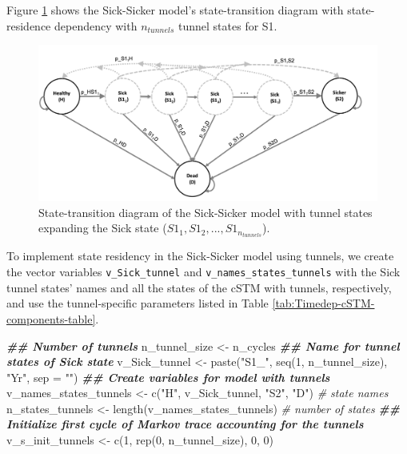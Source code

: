 \documentclass[
]{article}
\newenvironment{Shaded}{\begin{snugshade}}{\end{snugshade}}
\newcommand{\AttributeTok}[1]{\textcolor[rgb]{0.77,0.63,0.00}{#1}}
\newcommand{\CommentTok}[1]{\textcolor[rgb]{0.56,0.35,0.01}{\textit{#1}}}
\newcommand{\DecValTok}[1]{\textcolor[rgb]{0.00,0.00,0.81}{#1}}
\newcommand{\DocumentationTok}[1]{\textcolor[rgb]{0.56,0.35,0.01}{\textbf{\textit{#1}}}}
\newcommand{\FunctionTok}[1]{\textcolor[rgb]{0.00,0.00,0.00}{#1}}
\newcommand{\NormalTok}[1]{#1}
\newcommand{\OtherTok}[1]{\textcolor[rgb]{0.56,0.35,0.01}{#1}}
\newcommand{\StringTok}[1]{\textcolor[rgb]{0.31,0.60,0.02}{#1}}
\begin{document}
Figure \ref{fig:STD-Sick-Sicker-tunnels} shows the Sick-Sicker model's state-transition diagram with state-residence dependency with \(n_{tunnels}\) tunnel states for S1.

\begin{figure}[H]

{\centering \includegraphics[width=1\linewidth]{figs/Sick-Sicker-with-tunnels} 

}

\caption{State-transition diagram of the Sick-Sicker model with tunnel states expanding the Sick state ($S1_1, S1_2,...,S1_{n_{tunnels}}$).}\label{fig:STD-Sick-Sicker-tunnels}
\end{figure}

To implement state residency in the Sick-Sicker model using tunnels, we create the vector variables \texttt{v\_Sick\_tunnel} and \texttt{v\_names\_states\_tunnels} with the Sick tunnel states' names and all the states of the cSTM with tunnels, respectively, and use the tunnel-specific parameters listed in Table \ref{tab:Timedep-cSTM-components-table}.

\begin{Shaded}
\begin{Highlighting}[]
\DocumentationTok{\#\# Number of tunnels}
\NormalTok{n\_tunnel\_size }\OtherTok{\textless{}{-}}\NormalTok{ n\_cycles }
\DocumentationTok{\#\# Name for tunnel states of Sick state}
\NormalTok{v\_Sick\_tunnel }\OtherTok{\textless{}{-}} \FunctionTok{paste}\NormalTok{(}\StringTok{"S1\_"}\NormalTok{, }\FunctionTok{seq}\NormalTok{(}\DecValTok{1}\NormalTok{, n\_tunnel\_size), }\StringTok{"Yr"}\NormalTok{, }\AttributeTok{sep =} \StringTok{""}\NormalTok{)}
\DocumentationTok{\#\# Create variables for model with tunnels}
\NormalTok{v\_names\_states\_tunnels }\OtherTok{\textless{}{-}} \FunctionTok{c}\NormalTok{(}\StringTok{"H"}\NormalTok{, v\_Sick\_tunnel, }\StringTok{"S2"}\NormalTok{, }\StringTok{"D"}\NormalTok{) }\CommentTok{\# state names}
\NormalTok{n\_states\_tunnels }\OtherTok{\textless{}{-}} \FunctionTok{length}\NormalTok{(v\_names\_states\_tunnels)         }\CommentTok{\# number of states}
\DocumentationTok{\#\# Initialize first cycle of Markov trace accounting for the tunnels}
\NormalTok{v\_s\_init\_tunnels }\OtherTok{\textless{}{-}} \FunctionTok{c}\NormalTok{(}\DecValTok{1}\NormalTok{, }\FunctionTok{rep}\NormalTok{(}\DecValTok{0}\NormalTok{, n\_tunnel\_size), }\DecValTok{0}\NormalTok{, }\DecValTok{0}\NormalTok{) }
\end{Highlighting}
\end{Shaded}
\end{document}
